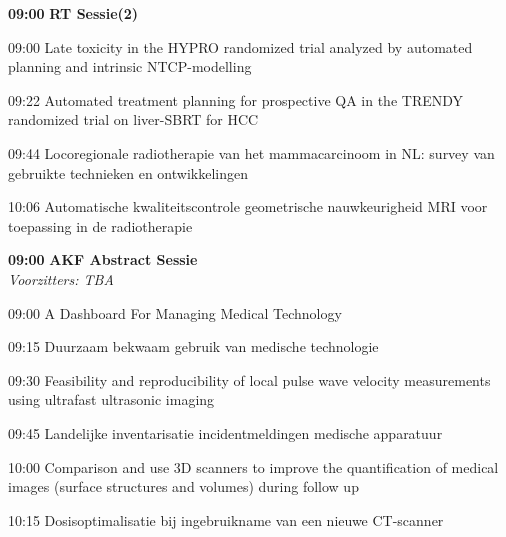 \documentclass[a4paper,10pt]{report}
\begin{document}
\begin{multicols*}{3}
\begin{packed_enum}
\item[\textbf{09:00}]{\textbf{RT Sessie(2)}}
\item[09:00] Late toxicity in the HYPRO randomized trial analyzed by automated planning and intrinsic NTCP-modelling
\item[09:22] Automated treatment planning for prospective QA in the TRENDY randomized trial on liver-SBRT for HCC
\item[09:44] Locoregionale radiotherapie van het mammacarcinoom in NL: survey van gebruikte technieken en ontwikkelingen
\item[10:06] Automatische kwaliteitscontrole geometrische nauw\-keur\-igheid MRI voor toepassing in de radiotherapie
\end{packed_enum} %

\vfill

\begin{packed_enum}
\item[\textbf{09:00}] \textbf{AKF Abstract Sessie}\\\textit{Voorzitters: TBA}
\item[09:00] A Dashboard For Managing Medical Technology
\item[09:15] Duurzaam bekwaam gebruik van medische technologie
\item[09:30] Feasibility and reproducibility of local pulse wave velocity measurements using ultrafast ultrasonic imaging
\item[09:45] Landelijke inventarisatie incidentmeldingen medische apparatuur 
\item[10:00] Comparison and use 3D scanners to improve the quantification of medical images (surface structures and volumes) during follow up 
\item[10:15] Dosisoptimalisatie bij ingebruikname van een nieuwe CT-scanner 
\end{packed_enum} %


\vfill


\end{multicols*}
\end{document}
